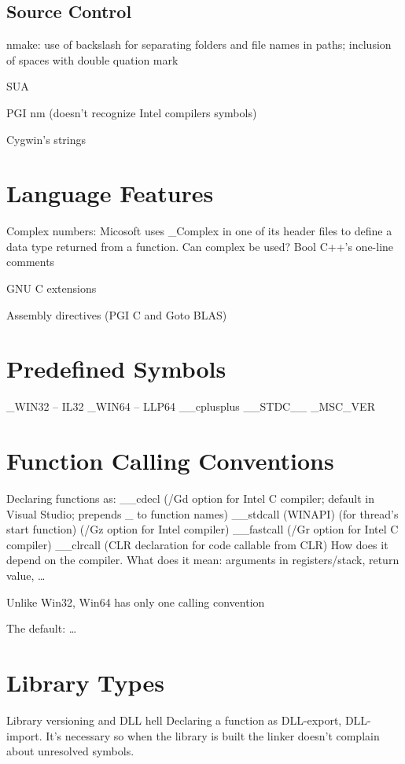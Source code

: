 \documentclass[letterpaper]{article}
\newcommand\ilc[1]{\textsf{#1}}
\begin{document}
\subsection{Source Control}
nmake: use of backslash for separating folders and file names in paths;
inclusion of spaces with double quation mark

SUA

PGI nm (doesn't recognize Intel compilers symbols)

Cygwin's \ilc{strings}

\section{Language Features}
Complex numbers: Micosoft uses \ilc{\_Complex} in one of its header files
to define a data type returned from a function. Can \ilc{complex} be used?
Bool
C++'s one-line comments

GNU C extensions

Assembly directives (PGI C and Goto BLAS)

\section{Predefined Symbols}
\_WIN32 -- IL32
\_WIN64 -- LLP64
\_\_cplusplus
\_\_STDC\_\_
\_MSC\_VER

\section{Function Calling Conventions}
Declaring functions as:
\_\_cdecl (/Gd option for Intel C compiler; default in Visual Studio; prepends \_ to function names)
\_\_stdcall (WINAPI) (for thread's start function) (/Gz option for Intel compiler)
\_\_fastcall (/Gr option for Intel C compiler)
\_\_clrcall (CLR declaration for code callable from CLR)
How does it depend on the compiler. What does it mean: arguments in registers/stack, return value, \ldots

Unlike Win32, Win64 has only one calling convention

The default: \ldots

\section{Library Types}
Library versioning and DLL hell
Declaring a function as DLL-export, DLL-import. It's necessary so when
the library is built the linker doesn't complain about unresolved symbols.
\end{document}
